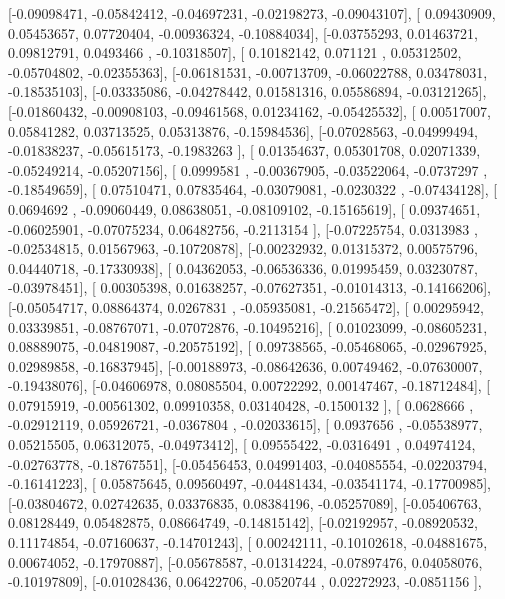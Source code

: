 \documentclass{article}
\begin{document}
       [-0.09098471, -0.05842412, -0.04697231, -0.02198273, -0.09043107],
       [ 0.09430909,  0.05453657,  0.07720404, -0.00936324, -0.10884034],
       [-0.03755293,  0.01463721,  0.09812791,  0.0493466 , -0.10318507],
       [ 0.10182142,  0.071121  ,  0.05312502, -0.05704802, -0.02355363],
       [-0.06181531, -0.00713709, -0.06022788,  0.03478031, -0.18535103],
       [-0.03335086, -0.04278442,  0.01581316,  0.05586894, -0.03121265],
       [-0.01860432, -0.00908103, -0.09461568,  0.01234162, -0.05425532],
       [ 0.00517007,  0.05841282,  0.03713525,  0.05313876, -0.15984536],
       [-0.07028563, -0.04999494, -0.01838237, -0.05615173, -0.1983263 ],
       [ 0.01354637,  0.05301708,  0.02071339, -0.05249214, -0.05207156],
       [ 0.0999581 , -0.00367905, -0.03522064, -0.0737297 , -0.18549659],
       [ 0.07510471,  0.07835464, -0.03079081, -0.0230322 , -0.07434128],
       [ 0.0694692 , -0.09060449,  0.08638051, -0.08109102, -0.15165619],
       [ 0.09374651, -0.06025901, -0.07075234,  0.06482756, -0.2113154 ],
       [-0.07225754,  0.0313983 , -0.02534815,  0.01567963, -0.10720878],
       [-0.00232932,  0.01315372,  0.00575796,  0.04440718, -0.17330938],
       [ 0.04362053, -0.06536336,  0.01995459,  0.03230787, -0.03978451],
       [ 0.00305398,  0.01638257, -0.07627351, -0.01014313, -0.14166206],
       [-0.05054717,  0.08864374,  0.0267831 , -0.05935081, -0.21565472],
       [ 0.00295942,  0.03339851, -0.08767071, -0.07072876, -0.10495216],
       [ 0.01023099, -0.08605231,  0.08889075, -0.04819087, -0.20575192],
       [ 0.09738565, -0.05468065, -0.02967925,  0.02989858, -0.16837945],
       [-0.00188973, -0.08642636,  0.00749462, -0.07630007, -0.19438076],
       [-0.04606978,  0.08085504,  0.00722292,  0.00147467, -0.18712484],
       [ 0.07915919, -0.00561302,  0.09910358,  0.03140428, -0.1500132 ],
       [ 0.0628666 , -0.02912119,  0.05926721, -0.0367804 , -0.02033615],
       [ 0.0937656 , -0.05538977,  0.05215505,  0.06312075, -0.04973412],
       [ 0.09555422, -0.0316491 ,  0.04974124, -0.02763778, -0.18767551],
       [-0.05456453,  0.04991403, -0.04085554, -0.02203794, -0.16141223],
       [ 0.05875645,  0.09560497, -0.04481434, -0.03541174, -0.17700985],
       [-0.03804672,  0.02742635,  0.03376835,  0.08384196, -0.05257089],
       [-0.05406763,  0.08128449,  0.05482875,  0.08664749, -0.14815142],
       [-0.02192957, -0.08920532,  0.11174854, -0.07160637, -0.14701243],
       [ 0.00242111, -0.10102618, -0.04881675,  0.00674052, -0.17970887],
       [-0.05678587, -0.01314224, -0.07897476,  0.04058076, -0.10197809],
       [-0.01028436,  0.06422706, -0.0520744 ,  0.02272923, -0.0851156 ],
\end{document}
